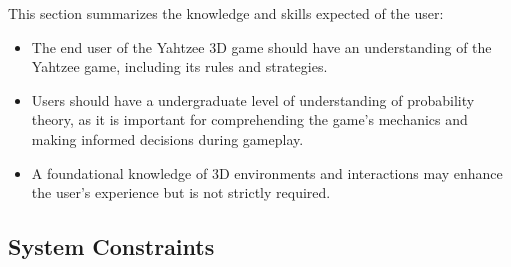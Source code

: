  This section summarizes the knowledge and skills expected of the user:
  
  \begin{itemize}
      \item The end user of the Yahtzee 3D game should have an understanding of the Yahtzee game, including its rules and strategies.
      
      \item Users should have a undergraduate level of understanding of probability theory, as it is important for comprehending the game's mechanics and making informed decisions during gameplay.
      
      \item A foundational knowledge of 3D environments and interactions may enhance the user's experience but is not strictly required.
  \end{itemize}
  

\subsection{System Constraints}


